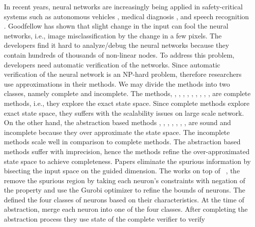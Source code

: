 In recent years, neural networks are increasingly being applied in
safety-critical systems such as autonomous vehicles \cite{bojarski2016end},
medical diagnosis \cite{amato2013artificial}, and speech recognition \cite{hinton2012deep}.
Goodfellow \cite{goodfellow2014explaining} has shown that slight change in the input can fool the neural networks,
i.e., image misclassification by the change in a few pixels.
The developers find it hard to analyze/debug the neural networks because they contain hundreds of thousands of non-linear nodes.
To address this problem, developers need automatic verification of the networks.
Since automatic verification of the neural network is an NP-hard problem, therefore researchers use approximations in their methods.
We may divide the methods into two classes, namely complete and incomplete.
The methods\cite{lomuscio2017approach}, \cite{fischetti2018deep},
\cite{dutta2018output}, \cite{cheng2017maximum}, \cite{katz2017reluplex}, \cite{katz2019marabou}, 
\cite{ehlers2017formal}, \cite{huang2017safety}, \cite{wang2021beta}, \cite{xu2020fast}, \cite{zhang2022general}
are complete methods, i.e., they explore the exact state space.
Since complete methods explore exact state space, they suffers with the scalability issues on large scale network.
On the other hand, the abstraction based methods
\cite{dvijotham2018dual}, \cite{gehr2018ai2}, \cite{singh2018fast},
 \cite{singh2018boosting}, \cite{weng2018towards}, \cite{wong2018provable}, \cite{zhang2018efficient}, \cite{zhang2018efficient}
are sound and incomplete because they over approximate the state space.
The incomplete methods scale well in comparison to complete methods. 
The abstraction based methods suffer with imprecision, hence the methods
\cite{wang2018formal,wang2018efficient,elboher2020abstraction,yang2021improving,lin2020art}
refine the over-approximated state space to achieve completeness. 
Papers \cite{wang2018formal,wang2018efficient,lin2020art} eliminate the
spurious information by bisecting the input space on the guided dimension. The \cite{yang2021improving} works
on top of \deeppoly{}~\cite{singh2019abstract}, the remove
the spurious region by taking each neuron's constraints with negation of the property and use the 
Gurobi optimizer \cite{gurobioptimizer} to refine the bounds of neurons.
The \cite{elboher2020abstraction} defined the four classes of neurons based on their characteristics.
At the time of abstraction, \cite{elboher2020abstraction} merge each neuron into one of the four classes. 
After completing the abstraction process they use state of the complete verifier to verify 
